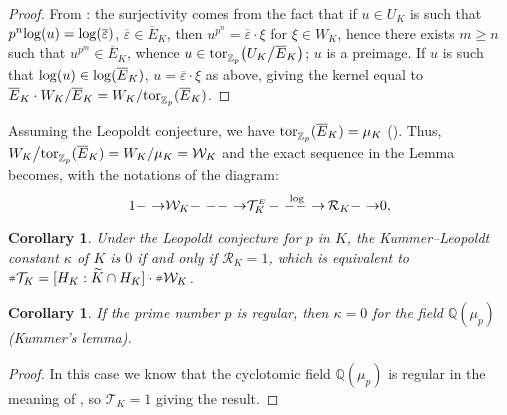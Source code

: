 \documentclass[12pt]{amsart}
\newtheorem{corollary}[theorem]{Corollary}
\theoremstyle{definition}
\numberwithin{equation}{section}
\let\sst=\scriptscriptstyle
\let\wt=\widetilde
\begin{document}
\begin{proof} From \cite[Lemma 4.2.4]{Gr1}: the surjectivity comes from the fact that if
$u \in U_K$ is such that $p^n {\rm log}(u) = {\rm log}(\overline\varepsilon)$, 
$\overline\varepsilon \in \overline E_K$, then $u^{p^n} = \overline\varepsilon \cdot \xi$ 
for $\xi \in W_K$, hence there exists $m\geq n$ such that $u^{p^m} \in \overline E_K$, 
whence $u \in  {\rm tor}_{{\mathbb{Z}}_p}^{} \big(U_K \big / \overline E_K \big)$; $u$ is a preimage.
If $u$ is such that ${\rm log}(u) \in {\rm log}(\overline E_K)$, 
$u = \overline \varepsilon \cdot \xi$ as above, giving the kernel equal to
$\overline E_K \cdot W_K /\overline E_K = W_K/ {\rm tor}_{{\mathbb{Z}}_p}^{}(\overline E_K)$.
\end{proof}

Assuming the Leopoldt conjecture, we have
${\rm tor}_{{\mathbb{Z}}_p}^{}(\overline E_K) = \mu_K$ (\cite[Corollary III.3.6.3]{Gr1}).
Thus, $W_K \big / {\rm tor}_{{\mathbb{Z}}_p}^{}(\overline E_K) = W_K /\mu_K = {\mathcal W}_K$
and the exact sequence in the Lemma becomes, with the notations of the diagram:
$$1{\relbar{\mathrel{\mkern-4mu}}\rightarrow} {\mathcal W}_K  {\relbar{\mathrel{\mkern-4mu}}\relbar{\mathrel{\mkern-4mu}}{\relbar{\mathrel{\mkern-4mu}}\rightarrow}} 
{\mathcal T}_K^{\sst E}  \mathop {\relbar{\mathrel{\mkern-4mu}}\relbar{\mathrel{\mkern-4mu}}{\relbar{\mathrel{\mkern-4mu}}\rightarrow}}^{{\rm log}}  {\mathcal R}_K {\relbar{\mathrel{\mkern-4mu}}\rightarrow} 0,$$

\begin{corollary} Under the Leopoldt conjecture for $p$ in $K$,
the Kummer--Leopoldt constant $\kappa$ of $K$ is $0$ if and only if
${\mathcal R}_K=1$, which is equivalent to ${\raise1.5pt \hbox{${\scriptscriptstyle \#}$}} {\mathcal T}_K = 
[H_K : \wt K \cap H_K] \cdot  {\raise1.5pt \hbox{${\scriptscriptstyle \#}$}} {\mathcal W}_K$.
\end{corollary}

\begin{corollary} If the prime number $p$ is regular, then $\kappa=0$
for the field ${\mathbb{Q}}(\mu_p)$ (Kummer's lemma).
\end{corollary}

\begin{proof} In this case we know that the cyclotomic field ${\mathbb{Q}}(\mu_p)$ 
is regular in the meaning of \cite[Th\'eor\`eme \& D\'efinition 2.1]{GJ}, 
so ${\mathcal T}_K = 1$ giving the result. 
\end{proof}
\end{document}
